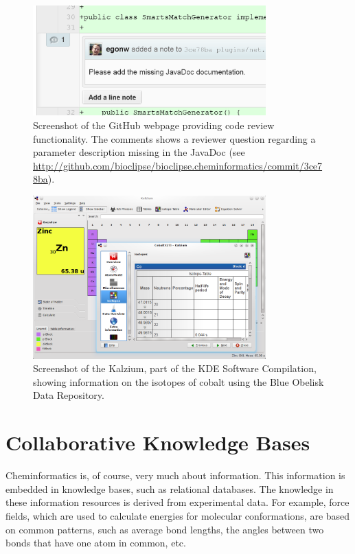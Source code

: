 \documentclass[11pt]{book}
\begin{document}
\begin{figure}[bt]
\begin{center}
\includegraphics[width=0.8\textwidth]{graphics/codeReview8.png}
\end{center}
\caption{Screenshot of the GitHub webpage providing code
review functionality. The comments shows a reviewer question
regarding a parameter description missing in the JavaDoc
(see \url{http://github.com/bioclipse/bioclipse.cheminformatics/commit/3ce78ba}).}
\label{fig:githubCodereview}
\end{figure}

\begin{figure}[bt]
\begin{center}
\includegraphics[width=0.8\textwidth]{graphics/kalzium.png}
\end{center}
\caption{Screenshot of the Kalzium, part of the KDE Software
Compilation, showing information on the
isotopes of cobalt using the Blue Obelisk Data Repository.}
\label{fig:kalzium}
\end{figure}

\section{Collaborative Knowledge Bases}

Cheminformatics is, of course, very much about information. This
information is embedded in knowledge bases, such as relational databases.
The knowledge in these information resources is derived from experimental
data. For example, force fields, which are used to calculate energies
for molecular conformations, are based on common patterns, such as
average bond lengths, the angles between two bonds that have one
atom in common, etc.
\end{document}
